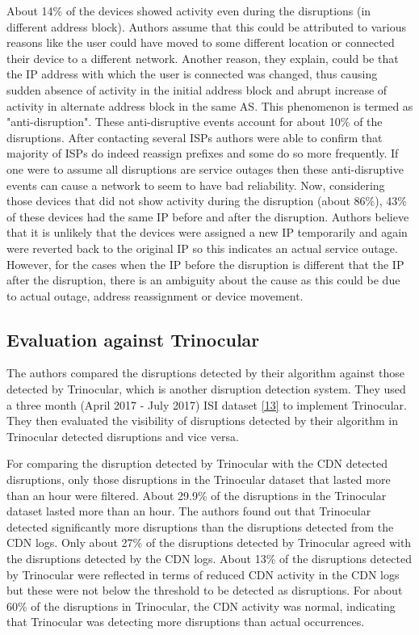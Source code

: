 \documentclass[11pt,twoside,a4paper]{article}
\begin{document}
About 14\% of the devices showed activity even during the disruptions (in different address block). Authors assume that this could be attributed to various reasons like the user could have moved to some different location or connected their device to a different network. Another reason, they explain, could be that the IP address with which the user is connected was changed, thus causing sudden absence of activity in the initial address block and abrupt increase of activity in alternate address block in the same AS. This phenomenon is termed as "anti-disruption". These anti-disruptive events account for about 10\% of the disruptions. After contacting several ISPs authors were able to confirm that majority of ISPs do indeed reassign prefixes and some do so more frequently. If one were to assume all disruptions are service outages then these anti-disruptive events can cause a network to seem to have bad reliability.   
Now, considering those devices that did not show activity during the disruption (about 86\%), 43\% of these devices had the same IP before and after the disruption. Authors believe that it is unlikely that the devices were assigned a new IP temporarily and again were reverted back to the original IP so this indicates an actual service outage. However, for the cases when the IP before the disruption is different that the IP after the disruption, there is an ambiguity about the cause as this could be due to actual outage, address reassignment or device movement.

\subsection{Evaluation against Trinocular} 
The authors compared the disruptions detected by their algorithm against those detected by Trinocular, which is another disruption detection system. They used a three month (April 2017 - July 2017) ISI dataset \hyperlink {K13}{[13]} to implement Trinocular. They then evaluated the visibility of disruptions detected by their algorithm in Trinocular detected disruptions and vice versa. 

For comparing the disruption detected by Trinocular with the CDN detected disruptions, only those disruptions in the Trinocular dataset that lasted more than an hour were filtered. About 29.9\% of the disruptions in the Trinocular dataset lasted more than an hour. The authors found out that Trinocular detected significantly more disruptions than the disruptions detected from the CDN logs. Only about 27\% of the disruptions detected by Trinocular agreed with the disruptions detected by the CDN logs. About 13\% of the disruptions detected by Trinocular were reflected in terms of reduced CDN activity in the CDN logs but these were not below the threshold to be detected as disruptions. For about 60\% of the disruptions in Trinocular, the CDN activity was normal, indicating that Trinocular was detecting more disruptions than actual occurrences.
\end{document}
